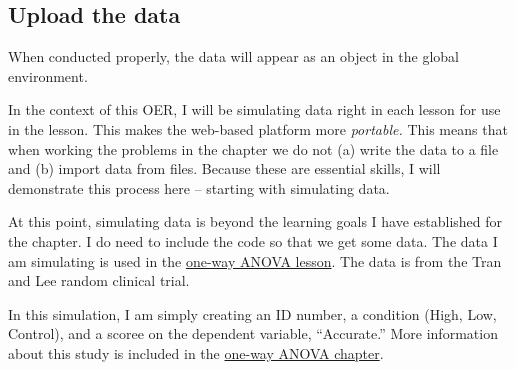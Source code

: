 \documentclass[
  english,
]{book}
\begin{document}
\hypertarget{upload-the-data}{%
\subsection{Upload the data}\label{upload-the-data}}

When conducted properly, the data will appear as an object in the global environment.

In the context of this OER, I will be simulating data right in each lesson for use in the lesson. This makes the web-based platform more \emph{portable.} This means that when working the problems in the chapter we do not (a) write the data to a file and (b) import data from files. Because these are essential skills, I will demonstrate this process here -- starting with simulating data.

At this point, simulating data is beyond the learning goals I have established for the chapter. I do need to include the code so that we get some data. The data I am simulating is used in the \protect\hyperlink{oneway}{one-way ANOVA lesson}. The data is from the Tran and Lee \citeyearpar{tran_you_2014} random clinical trial.

In this simulation, I am simply creating an ID number, a condition (High, Low, Control), and a scoree on the dependent variable, ``Accurate.'' More information about this study is included in the \protect\hyperlink{oneway}{one-way ANOVA chapter}.
\end{document}
